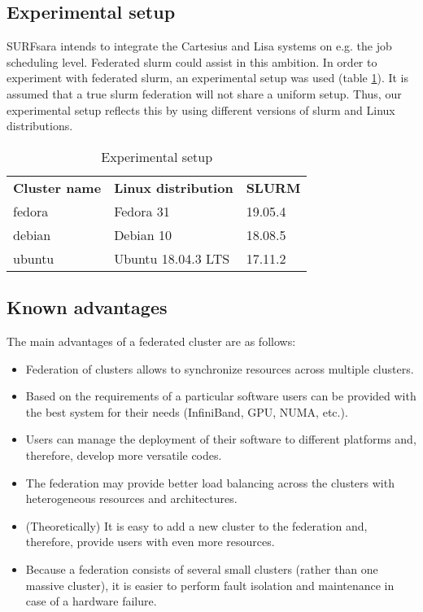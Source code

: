 \documentclass[conference]{IEEEtran}
\begin{document}
\subsection{Experimental setup}
SURFsara intends to integrate the Cartesius and Lisa systems on e.g. the job scheduling level. Federated \gls{slurm} could assist in this ambition. In order to experiment with federated \gls{slurm}, an experimental setup was used (table \ref{tab-experimental-setup}). It is assumed that a true \gls{slurm} federation will not share a uniform setup. Thus, our experimental setup reflects this by using different versions of \gls{slurm} and Linux distributions.

\begin{table}[H]
\begin{center}
\caption{Experimental setup}
\label{tab-experimental-setup}
\begin{tabular}{lll}
\textbf{Cluster name} & \textbf{Linux distribution} & \textbf{SLURM} \\
fedora                & Fedora 31                   & 19.05.4        \\
debian                & Debian 10                   & 18.08.5        \\
ubuntu                & Ubuntu 18.04.3 LTS          & 17.11.2         
\end{tabular}
\end{center}
\end{table}

\subsection{Known advantages}
The main advantages of a federated cluster are as follows:
\begin{itemize}
    \item Federation of clusters allows to synchronize resources across multiple clusters.
    \item Based on the requirements of a particular software users can be provided with the best system for their needs (InfiniBand, GPU, NUMA, etc.).
    \item Users can manage the deployment of their software to different platforms and, therefore, develop more versatile codes.
    \item The federation may provide better load balancing across the clusters with heterogeneous resources and architectures.
    \item (Theoretically) It is easy to add a new cluster to the federation and, therefore, provide users with even more resources.
    \item Because a federation consists of several small clusters (rather than one massive cluster), it is easier to perform fault isolation and maintenance in case of a hardware failure.
\end{itemize}
\end{document}
